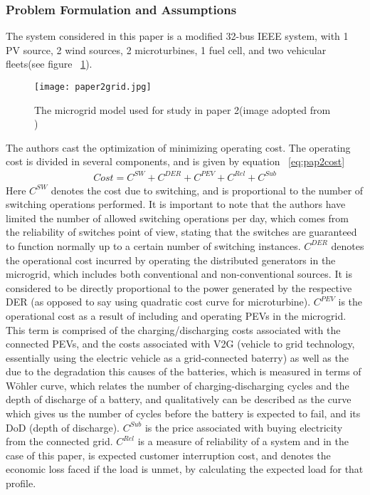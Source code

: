 \subsubsection{Problem Formulation and Assumptions}
The system considered in this paper is a modified 32-bus IEEE system, with 1 PV source, 2 wind sources, 2 microturbines, 1 fuel cell, and two vehicular fleets(see figure ~\ref{fig:pap2grid}).
\begin{figure}[tbp]
  \centering
    \texttt{[image: paper2grid.jpg]}%
    \caption[Paper 2 Microgrid System]{The microgrid model used for study in paper 2(image adopted from \cite{Kavousi-Fard2016653})}
    \label{fig:pap2grid} 
\end{figure}
The authors cast the optimization of minimizing operating cost. The operating cost is divided in several components, and is given by equation ~\eqref{eq:pap2cost}
\begin{eqnarray}
\label{eq:pap2cost}
Cost = C^{SW} + C^{DER} + C^{PEV} + C^{Rel} + C^{Sub}
\end{eqnarray}
Here $C^{SW}$ denotes the cost due to switching, and is proportional to the number of switching operations performed. It is important to note that the authors have limited the number of allowed switching operations per day, which comes from the reliability of switches point of view, stating that the switches are guaranteed to function normally up to a certain number of switching instances. $ C^{DER}$ denotes the operational cost incurred by operating the distributed generators in the microgrid, which includes both conventional and non-conventional sources. It is considered to be directly proportional to the power generated by the respective DER (as opposed to say using quadratic cost curve for microturbine). $C^{PEV}$ is the operational cost as a result of including and operating PEVs in the microgrid. This term is comprised of the charging/discharging costs associated with the connected PEVs, and the costs associated with V2G (vehicle to grid technology, essentially using the electric vehicle as a grid-connected baterry) as well as the due to the degradation this causes of the batteries, which is measured in terms of W\"{o}hler curve, which relates the number of charging-discharging cycles and the depth of discharge of a battery, and qualitatively can be described as the curve which gives us the number of cycles before the battery is expected to fail, and its DoD (depth of discharge). $C^{Sub}$ is the price associated with buying electricity from the connected grid. $C^{Rel}$ is a measure of reliability of a system and in the case of this paper, is expected customer interruption cost, and  denotes the economic loss faced if the load is unmet, by calculating the expected load for that profile. \\
